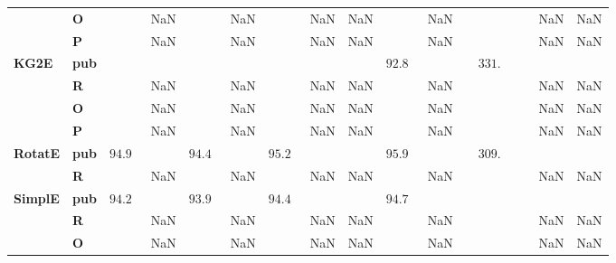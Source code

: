 \begin{tabular}{llrrrrrrr}
       & \textbf{O} &                         NaN &                         NaN &                         NaN &         NaN &                         NaN &                                        NaN &      NaN \\
       & \textbf{P} &                         NaN &                         NaN &                         NaN &         NaN &                         NaN &                                        NaN &      NaN \\\midrule
\textbf{KG2E} & \textbf{pub} &                             &                             &                             &             &  $92.8\phantom{0 \pm 0.00}$ &  $\phantom{00}331.\phantom{00 \pm 000.00}$ &          \\
       & \textbf{R} &                         NaN &                         NaN &                         NaN &         NaN &                         NaN &                                        NaN &      NaN \\
       & \textbf{O} &                         NaN &                         NaN &                         NaN &         NaN &                         NaN &                                        NaN &      NaN \\
       & \textbf{P} &                         NaN &                         NaN &                         NaN &         NaN &                         NaN &                                        NaN &      NaN \\\midrule
\textbf{RotatE} & \textbf{pub} &  $94.9\phantom{0 \pm 0.00}$ &  $94.4\phantom{0 \pm 0.00}$ &  $95.2\phantom{0 \pm 0.00}$ &             &  $95.9\phantom{0 \pm 0.00}$ &  $\phantom{00}309.\phantom{00 \pm 000.00}$ &          \\
       & \textbf{R} &                         NaN &                         NaN &                         NaN &         NaN &                         NaN &                                        NaN &      NaN \\\midrule
\textbf{SimplE} & \textbf{pub} &  $94.2\phantom{0 \pm 0.00}$ &  $93.9\phantom{0 \pm 0.00}$ &  $94.4\phantom{0 \pm 0.00}$ &             &  $94.7\phantom{0 \pm 0.00}$ &                                            &          \\
       & \textbf{R} &                         NaN &                         NaN &                         NaN &         NaN &                         NaN &                                        NaN &      NaN \\
       & \textbf{O} &                         NaN &                         NaN &                         NaN &         NaN &                         NaN &                                        NaN &      NaN \\

\end{tabular}
